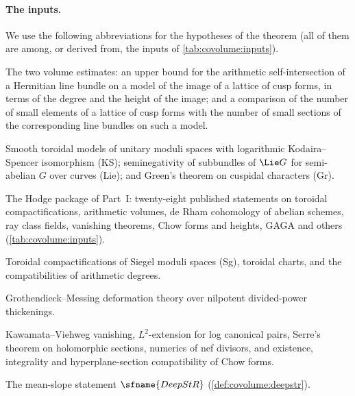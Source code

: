 \paragraph{The inputs.} We use the following abbreviations for the hypotheses of the theorem (all of them are
among, or derived from, the inputs of \cref{tab:covolume:inputs}).
\begin{description}[style=unboxed,leftmargin=0pt,font=\normalfont]
\item[(VE)] The two volume estimates: an upper bound for the arithmetic self-intersection of a Hermitian line bundle
on a model of the image of a lattice of cusp forms, in terms of the degree and the height of the image; and a
comparison of the number of small elements of a lattice of cusp forms with the number of small sections of the
corresponding line bundles on such a model.
\item[(X)] Smooth toroidal models of unitary moduli spaces with logarithmic Kodaira--Spencer isomorphism
\textup{(KS)}; seminegativity of subbundles of $\Lie G$ for semi-abelian $G$ over curves \textup{(Lie)}; and Green's
theorem on cuspidal characters \textup{(Gr)}.
\item[(Hg)] The Hodge package of Part~I: twenty-eight published statements on toroidal compactifications,
arithmetic volumes, de Rham cohomology of abelian schemes, ray class fields, vanishing theorems, Chow forms and
heights, GAGA and others (\cref{tab:covolume:inputs}).
\item[(H)] Toroidal compactifications of Siegel moduli spaces \textup{(Sg)}, toroidal charts, and the
compatibilities of arithmetic degrees.
\item[(GM)] Grothendieck--Messing deformation theory over nilpotent divided-power thickenings.
\item[(Q)] Kawamata--Viehweg vanishing, $L^2$-extension for log canonical pairs, Serre's theorem on holomorphic
sections, numerics of nef divisors, and existence, integrality and hyperplane-section compatibility of Chow forms.
\item[(DS)] The mean-slope statement $\sfname{DeepStR}$ (\cref{def:covolume:deepstr}).
\end{description}

